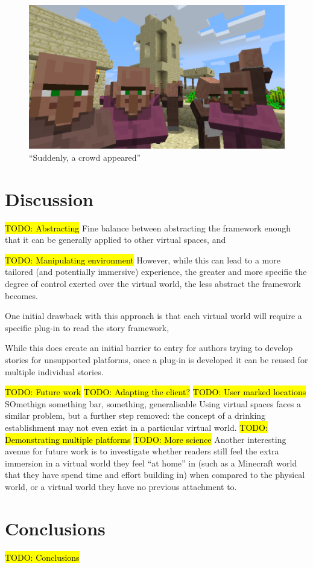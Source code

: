 \documentclass{acm}
\newcommand{\TODO}[1]{\hl{TODO: #1}}
\begin{document}
\begin{figure}
\centering
\includegraphics[scale=0.24]{./figures/villagers.png}
\caption{``Suddenly, a crowd appeared''}
\label{figure:villagers}
\end{figure}


\section{Discussion}
\TODO{Abstracting}
Fine balance between abstracting the framework enough that it can be generally applied to other virtual spaces, and 


\TODO{Manipulating environment}
However, while this can lead to a more tailored (and potentially immersive) experience, the greater and more specific the degree of control exerted over the virtual world, the less abstract the framework becomes.

One initial drawback with this approach is that each virtual world will require a specific plug-in to read the story framework, 

While this does create an initial barrier to entry for authors trying to develop stories for unsupported platforms, once a plug-in is developed it can be reused for multiple individual stories.

\TODO{Future work}
\TODO{Adapting the client?}
\TODO{User marked locations}
SOmethign something bar, something, generalisable
Using virtual spaces faces a similar problem, but a further step removed: the concept  of a drinking establishment may not even exist in a particular virtual world.
\TODO{Demonstrating multiple platforms}
\TODO{More science}
Another interesting avenue for future work is to investigate whether readers still feel the extra immersion in a virtual world they feel ``at home'' in (such as a Minecraft world that they have spend time and effort building in) when compared to the physical world, or a virtual world they have no previous attachment to.

\section{Conclusions}
\TODO{Conclusions}



\end{document}
